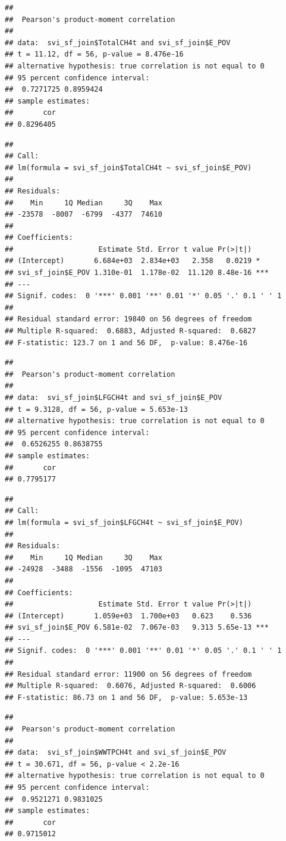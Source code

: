 \documentclass[
  12pt,
]{article}
\begin{document}
\begin{verbatim}
## 
##  Pearson's product-moment correlation
## 
## data:  svi_sf_join$TotalCH4t and svi_sf_join$E_POV
## t = 11.12, df = 56, p-value = 8.476e-16
## alternative hypothesis: true correlation is not equal to 0
## 95 percent confidence interval:
##  0.7271725 0.8959424
## sample estimates:
##       cor 
## 0.8296405
\end{verbatim}

\begin{verbatim}
## 
## Call:
## lm(formula = svi_sf_join$TotalCH4t ~ svi_sf_join$E_POV)
## 
## Residuals:
##    Min     1Q Median     3Q    Max 
## -23578  -8007  -6799  -4377  74610 
## 
## Coefficients:
##                    Estimate Std. Error t value Pr(>|t|)    
## (Intercept)       6.684e+03  2.834e+03   2.358   0.0219 *  
## svi_sf_join$E_POV 1.310e-01  1.178e-02  11.120 8.48e-16 ***
## ---
## Signif. codes:  0 '***' 0.001 '**' 0.01 '*' 0.05 '.' 0.1 ' ' 1
## 
## Residual standard error: 19840 on 56 degrees of freedom
## Multiple R-squared:  0.6883, Adjusted R-squared:  0.6827 
## F-statistic: 123.7 on 1 and 56 DF,  p-value: 8.476e-16
\end{verbatim}

\begin{verbatim}
## 
##  Pearson's product-moment correlation
## 
## data:  svi_sf_join$LFGCH4t and svi_sf_join$E_POV
## t = 9.3128, df = 56, p-value = 5.653e-13
## alternative hypothesis: true correlation is not equal to 0
## 95 percent confidence interval:
##  0.6526255 0.8638755
## sample estimates:
##       cor 
## 0.7795177
\end{verbatim}

\begin{verbatim}
## 
## Call:
## lm(formula = svi_sf_join$LFGCH4t ~ svi_sf_join$E_POV)
## 
## Residuals:
##    Min     1Q Median     3Q    Max 
## -24928  -3488  -1556  -1095  47103 
## 
## Coefficients:
##                    Estimate Std. Error t value Pr(>|t|)    
## (Intercept)       1.059e+03  1.700e+03   0.623    0.536    
## svi_sf_join$E_POV 6.581e-02  7.067e-03   9.313 5.65e-13 ***
## ---
## Signif. codes:  0 '***' 0.001 '**' 0.01 '*' 0.05 '.' 0.1 ' ' 1
## 
## Residual standard error: 11900 on 56 degrees of freedom
## Multiple R-squared:  0.6076, Adjusted R-squared:  0.6006 
## F-statistic: 86.73 on 1 and 56 DF,  p-value: 5.653e-13
\end{verbatim}

\begin{verbatim}
## 
##  Pearson's product-moment correlation
## 
## data:  svi_sf_join$WWTPCH4t and svi_sf_join$E_POV
## t = 30.671, df = 56, p-value < 2.2e-16
## alternative hypothesis: true correlation is not equal to 0
## 95 percent confidence interval:
##  0.9521271 0.9831025
## sample estimates:
##       cor 
## 0.9715012
\end{verbatim}
\end{document}
